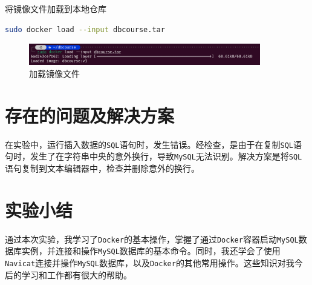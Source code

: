 \documentclass{article}
\begin{document}
将镜像文件加载到本地仓库

\begin{lstlisting}[language=bash]
sudo docker load --input dbcourse.tar
\end{lstlisting}

\begin{figure}[H]
\centering
\includegraphics[width=0.9\textwidth]{img/33.png}
\caption{加载镜像文件}
\end{figure}

\section{存在的问题及解决方案}

在实验中，运行插入数据的\texttt{SQL}语句时，发生错误。经检查，是由于在复制\texttt{SQL}语句时，发生了在字符串中央的意外换行，导致\texttt{MySQL}无法识别。解决方案是将\texttt{SQL}语句复制到文本编辑器中，检查并删除意外的换行。

\section{实验小结}

通过本次实验，我学习了\texttt{Docker}的基本操作，掌握了通过\texttt{Docker}容器启动\texttt{MySQL}数据库实例，并连接和操作\texttt{MySQL}数据库的基本命令。同时，我还学会了使用\texttt{Navicat}连接并操作\texttt{MySQL}数据库，以及\texttt{Docker}的其他常用操作。这些知识对我今后的学习和工作都有很大的帮助。
\end{document}
